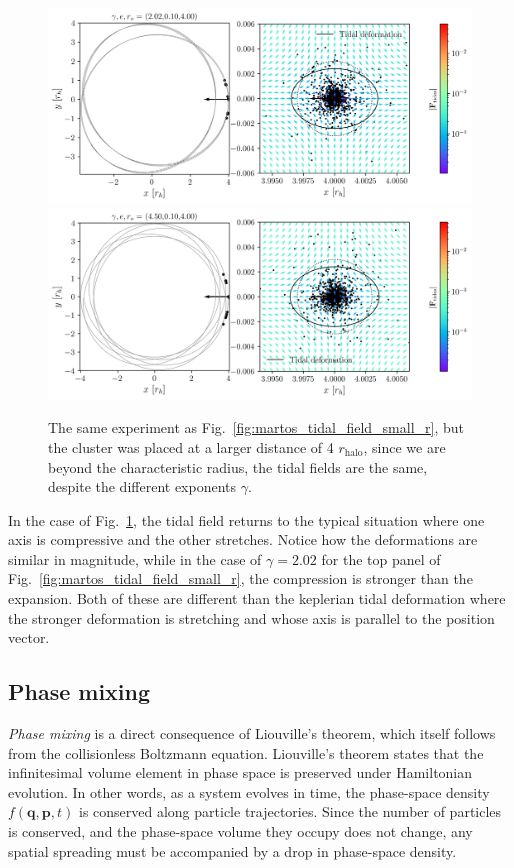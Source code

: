             \begin{figure}
                \includegraphics[width=\linewidth]{images/martos_tidal_field_202_10_400.png}
                \includegraphics[width=\linewidth]{images/martos_tidal_field_450_10_400.png}
                \caption{The same experiment as Fig.~\ref{fig:martos_tidal_field_small_r}, but the cluster was placed at a larger distance of 4 $r_\textrm{halo}$, since we are beyond the characteristic radius, the tidal fields are the same, despite the different exponents $\gamma$.}
                \label{fig:martos_tidal_field_big_r}
            \end{figure}

            In the case of Fig.~\ref{fig:martos_tidal_field_big_r}, the tidal field returns to the typical situation where one axis is compressive and the other stretches. Notice how the deformations are similar in magnitude, while in the case of $\gamma=2.02$ for the top panel of Fig.~\ref{fig:martos_tidal_field_small_r}, the compression is stronger than the expansion. Both of these are different than the keplerian tidal deformation where the stronger deformation is stretching and whose axis is parallel to the position vector. 






    \subsection{Phase mixing}
        \textit{Phase mixing} is a direct consequence of Liouville's theorem, which itself follows from the collisionless Boltzmann equation. Liouville's theorem states that the infinitesimal volume element in phase space is preserved under Hamiltonian evolution. In other words, as a system evolves in time, the phase-space density \( f(\mathbf{q}, \mathbf{p}, t) \) is conserved along particle trajectories. Since the number of particles is conserved, and the phase-space volume they occupy does not change, any spatial spreading must be accompanied by a drop in phase-space density.

